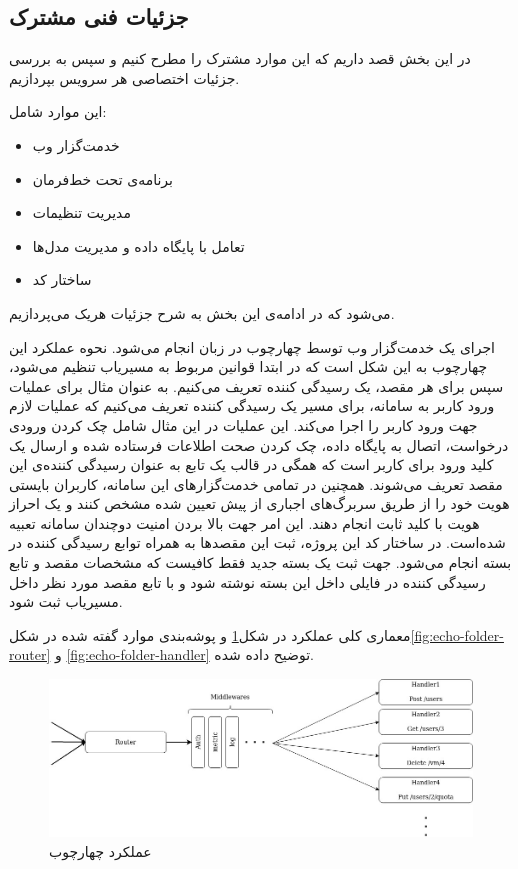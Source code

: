 \subsection{جزئیات فنی مشترک}
در این بخش قصد داریم که این موارد مشترک را مطرح کنیم و سپس به بررسی جزئیات اختصاصی هر سرویس بپردازیم.

این موارد شامل:

\begin{itemize}
	\item خدمت‌گزار وب
	\item برنامه‌ی تحت خط‌‌فرمان
	\item مدیریت تنظیمات
	\item تعامل با پایگاه داده و مدیریت مدل‌ها
	\item ساختار کد
\end{itemize}
می‌شود که در ادامه‌ی این بخش به شرح جزئیات هر‌یک می‌پردازیم.


اجرای یک خدمت‌گزار وب توسط چهارچوب  در زبان  انجام می‌شود. نحوه عملکرد این چهارچوب به این شکل است که در ابتدا قوانین مربوط به مسیریاب تنظیم می‌شود، سپس برای هر مقصد، یک رسیدگی کننده تعریف می‌کنیم. به عنوان مثال برای عملیات ورود کاربر به سامانه، برای مسیر  یک رسیدگی کننده تعریف می‌کنیم که عملیات لازم جهت ورود کاربر را اجرا می‌کند. این عملیات در این مثال شامل چک کردن ورودی درخواست، اتصال به پایگاه داده، چک کردن صحت اطلاعات فرستاده شده و ارسال یک کلید ورود برای کاربر است که همگی در قالب یک تابع به عنوان رسیدگی کننده‌ی این مقصد تعریف می‌شوند. همچنین در تمامی خدمت‌گزار‌های این سامانه، کاربران بایستی هویت خود را از طریق سربرگ‌های اجباری از پیش تعیین شده مشخص کنند و یک احراز هویت با کلید ثابت انجام دهند. این امر جهت بالا بردن امنیت دوچندان سامانه تعبیه شده‌است.
در ساختار کد این پروژه، ثبت این مقصدها به همراه توابع رسیدگی کننده در بسته  انجام می‌شود. جهت ثبت یک بسته جدید فقط کافیست که مشخصات مقصد و تابع رسیدگی کننده در فایلی داخل این بسته نوشته شود و با تابع  مقصد مورد نظر داخل مسیریاب  ثبت شود.

معماری کلی عملکرد  در شکل\ref{fig:echo-workflow} و پوشه‌بندی موارد گفته شده در شکل\ref{fig:echo-folder-router} و \ref{fig:echo-folder-handler} توضیح داده شده.

\begin{figure}
	\centering
	\includegraphics[scale=0.45]{figures/echo-workflow.jpeg}
	\caption{عملکرد چهارچوب }
	\label{fig:echo-workflow}
\end{figure}

